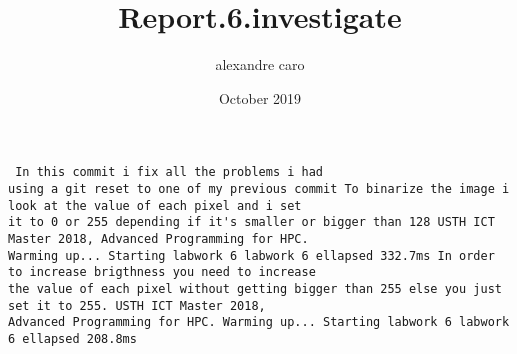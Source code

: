 \documentclass{article} \usepackage[utf8]{inputenc} \title{Report.6.investigate} \author{alexandre caro }
\date{October 2019}
\begin{document}
 \maketitle \begin{verbatim} In this commit i fix all the problems i had 
using a git reset to one of my previous commit To binarize the image i look at the value of each pixel and i set 
it to 0 or 255 depending if it's smaller or bigger than 128 USTH ICT Master 2018, Advanced Programming for HPC. 
Warming up... Starting labwork 6 labwork 6 ellapsed 332.7ms In order to increase brigthness you need to increase 
the value of each pixel without getting bigger than 255 else you just set it to 255. USTH ICT Master 2018, 
Advanced Programming for HPC. Warming up... Starting labwork 6 labwork 6 ellapsed 208.8ms \end{verbatim} 
\end{document}
